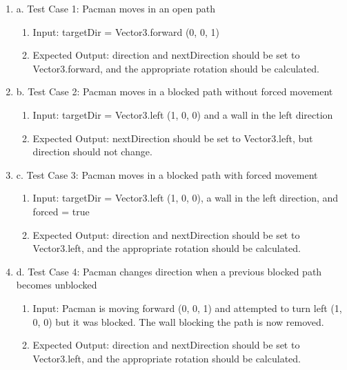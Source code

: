 \documentclass[11pt]{article}
\begin{document}
    \begin{enumerate}
        \item a. Test Case 1: Pacman moves in an open path
        \begin{enumerate}
            \item Input: targetDir = Vector3.forward (0, 0, 1)
            \item Expected Output: direction and nextDirection should be set to Vector3.forward, and the appropriate rotation should be calculated.
        \end{enumerate}
        
        \item b. Test Case 2: Pacman moves in a blocked path without forced movement
        \begin{enumerate}
            \item Input: targetDir = Vector3.left (1, 0, 0) and a wall in the left direction
            \item Expected Output: nextDirection should be set to Vector3.left, but direction should not change.
        \end{enumerate}
        
        \item c. Test Case 3: Pacman moves in a blocked path with forced movement
        \begin{enumerate}
            \item Input: targetDir = Vector3.left (1, 0, 0), a wall in the left direction, and forced = true
            \item Expected Output: direction and nextDirection should be set to Vector3.left, and the appropriate rotation should be calculated.
        \end{enumerate}
        
        \item d. Test Case 4: Pacman changes direction when a previous blocked path becomes unblocked
        \begin{enumerate}
            \item Input: Pacman is moving forward (0, 0, 1) and attempted to turn left (1, 0, 0) but it was blocked. The wall blocking the path is now removed.
            \item Expected Output: direction and nextDirection should be set to Vector3.left, and the appropriate rotation should be calculated.
        \end{enumerate}
    \end{enumerate}
\end{document}
